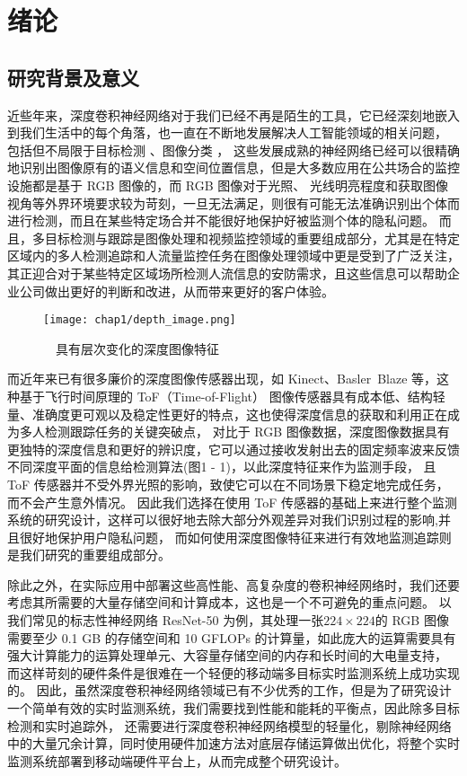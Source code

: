 %

\chapter{绪论}
\label{chap1}
\section{研究背景及意义}
近些年来，深度卷积神经网络对于我们已经不再是陌生的工具，它已经深刻地嵌入到我们生活中的每个角落，也一直在不断地发展解决人工智能领域的相关问题，
包括但不局限于目标检测 \cite{35,36}、图像分类 \cite{29,73}，
这些发展成熟的神经网络已经可以很精确地识别出图像原有的语义信息和空间位置信息，但是大多数应用在公共场合的监控设施都是基于 RGB 图像的，而 RGB 图像对于光照、
光线明亮程度和获取图像视角等外界环境要求较为苛刻，一旦无法满足，则很有可能无法准确识别出个体而进行检测，而且在某些特定场合并不能很好地保护好被监测个体的隐私问题。
而且，多目标检测与跟踪是图像处理和视频监控领域的重要组成部分，尤其是在特定区域内的多人检测追踪和人流量监控任务在图像处理领域中更是受到了广泛关注，
其正迎合对于某些特定区域场所检测人流信息的安防需求，且这些信息可以帮助企业公司做出更好的判断和改进，从而带来更好的客户体验。
\begin{figure}[h]
	\centering
	\texttt{[image: chap1/depth\_image.png]}
	\caption{\ \ 具有层次变化的深度图像特征}
	\label{fig1-1}
\end{figure}

而近年来已有很多廉价的深度图像传感器出现，如 Kinect、Basler\ Blaze 等，这种基于飞行时间原理的 ToF（Time-of-Flight）
图像传感器具有成本低、结构轻量、准确度更可观以及稳定性更好的特点\cite{1}，这也使得深度信息的获取和利用正在成为多人检测跟踪任务的关键突破点，
对比于 RGB 图像数据，深度图像数据具有更独特的深度信息和更好的辨识度，它可以通过接收发射出去的固定频率波来反馈不同深度平面的信息给检测算法(图1 - 1)，以此深度特征来作为监测手段，
且 ToF 传感器并不受外界光照的影响，致使它可以在不同场景下稳定地完成任务，而不会产生意外情况。
因此我们选择在使用 ToF 传感器的基础上来进行整个监测系统的研究设计，这样可以很好地去除大部分外观差异对我们识别过程的影响,并且很好地保护用户隐私问题，
而如何使用深度图像特征来进行有效地监测追踪则是我们研究的重要组成部分。

除此之外，在实际应用中部署这些高性能、高复杂度的卷积神经网络时，我们还要考虑其所需要的大量存储空间和计算成本，这也是一个不可避免的重点问题。
以我们常见的标志性神经网络 ResNet-50\cite{73} 为例，其处理一张$224\times 224$的
RGB 图像需要至少 0.1 GB 的存储空间和 10 GFLOPs 的计算量，如此庞大的运算需要具有强大计算能力的运算处理单元、大容量存储空间的内存和长时间的大电量支持，
而这样苛刻的硬件条件是很难在一个轻便的移动端多目标实时监测系统上成功实现的。
因此，虽然深度卷积神经网络领域已有不少优秀的工作，但是为了研究设计一个简单有效的实时监测系统，我们需要找到性能和能耗的平衡点，因此除多目标检测和实时追踪外，
还需要进行深度卷积神经网络模型的轻量化，剔除神经网络中的大量冗余计算，同时使用硬件加速方法对底层存储运算做出优化，将整个实时监测系统部署到移动端硬件平台上，从而完成整个研究设计。

